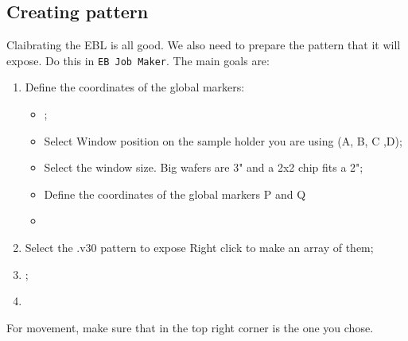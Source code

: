  \subsection{Creating pattern\label{subsec:jobMaker}}
 Claibrating  the  EBL is  all  good.  We also  need  to
 prepare the  pattern that  it will  expose. Do  this in
 \verb|EB Job Maker|. The main goals are:
 \begin{enumerate}
 \item Define the coordinates of the global markers:
   \begin{itemize}
   \item {};
   \item Select Window position on the sample holder you
     are using (A, B, C ,D);
   \item Select the window size. Big wafers are 3" and a
     2x2 chip fits a 2";
   \item Define the coordinates  of the global markers P
     and Q  
   \item  {}
   \end{itemize}
 \item Select the .v30 pattern to expose \ra Right click
   to make an array of them;
 \item {} \ra {};
 \item {}
 \end{enumerate}


 \begin{framed}\noindent
   For movement, make sure that  in the top right corner is the one you chose.
 \end{framed}
 \newpage
